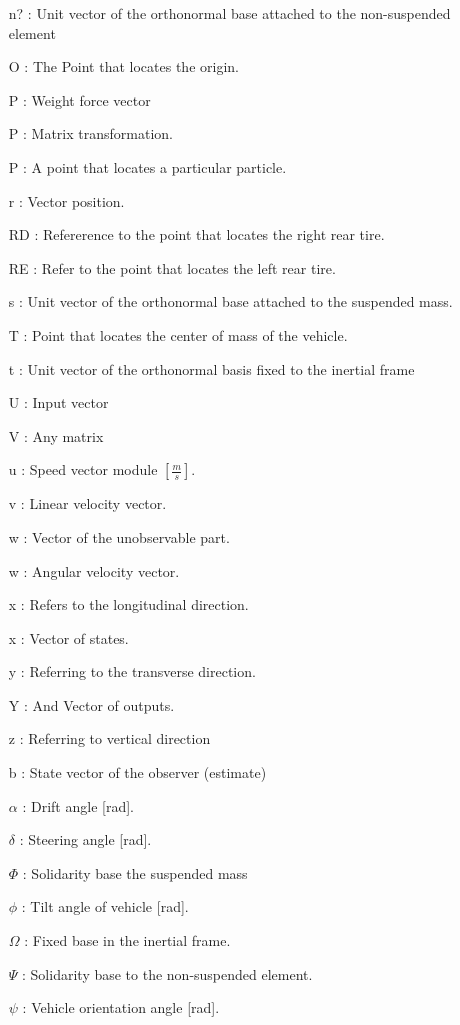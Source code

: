 \documentclass[sublist,a4paper,twoside,11pt]{article}
\begin{document}
\begin{itemize}
\item [n?]: Unit vector of the orthonormal base attached to the non-suspended element
\item [O]: The Point that locates the origin.
\item [P]: Weight force vector
\item [P]: Matrix transformation.
\item [P]: A point that locates a particular particle.
\item [r]: Vector position.
\item [RD]: Refererence to the point that locates the right rear tire.
\item [RE]: Refer to the point that locates the left rear tire.
\item [s]: Unit vector of the orthonormal base attached to the suspended mass.
\item [T]: Point that locates the center of mass of the vehicle.
\item [t]: Unit vector of the orthonormal basis fixed to the inertial frame
\item [U]: Input vector
\item [V]: Any matrix
\item [u]: Speed vector module $[\frac{m}{s}]$.
\item [v]: Linear velocity vector.
\item [w]: Vector of the unobservable part.
\item [w]: Angular velocity vector.
\item [x]: Refers to the longitudinal direction.
\item [x]: Vector of states.
\item [y]: Referring to the transverse direction.
\item [Y]: And Vector of outputs.
\item [z]: Referring to vertical direction
\item [b]: State vector of the observer (estimate)
\item [$\alpha$]: Drift angle [rad].
\item [$\delta$]: Steering angle [rad].
\item [$\Phi$]: Solidarity base the suspended mass
\item [$\phi$]: Tilt angle of vehicle [rad].
\item [$\Omega$]: Fixed base in the inertial frame.
\item [$\Psi$]: Solidarity base to the non-suspended element.
\item [$\psi$]: Vehicle orientation angle [rad].
\end{itemize}
\end{document}
